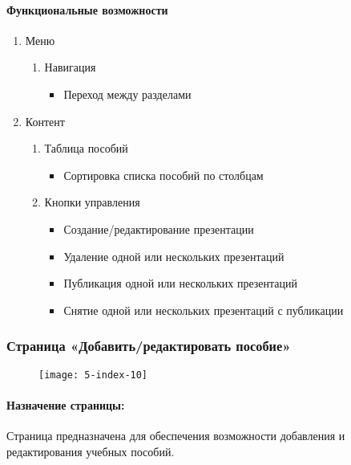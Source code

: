 \paragraph{Функциональные возможности}
\begin{enumerate}
	\item Меню
	\begin{enumerate}
		\item Навигация
		\begin{itemize}
			\item Переход между разделами
		\end{itemize}
	\end{enumerate}

	\item Контент
	\begin{enumerate}
		\item Таблица пособий
		\begin{itemize}
			\item Сортировка списка пособий по столбцам
		\end{itemize}

		\item Кнопки управления
		\begin{itemize}
			\item Создание/редактирование презентации
			\item Удаление одной или нескольких презентаций
			\item Публикация одной или нескольких презентаций
			\item Снятие одной или нескольких презентаций с публикации
		\end{itemize}
	\end{enumerate}
\end{enumerate}


\subsubsection{Страница «Добавить/редактировать пособие»}
\begin{figure}[H]
\texttt{[image: 5-index-10]}
\end{figure}
\paragraph{Назначение страницы:} Страница предназначена для обеспечения возможности добавления и редактирования учебных пособий.

